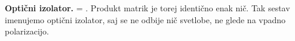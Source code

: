 \begin{example}{\bf Optični izolator.}
\left[\begin{array}{cc}
1 & 0 \\
0 & -1\\
\end{array}\right]
\cdot 
\left[\begin{array}{cc}
1 &  1 \\
i & i\\
\end{array}\right] = 
\left[\!\!\begin{array}{cc}
0 & 0\\
0 & 0\\
\end{array}\right]\!\!.
\label{eq:03_63}
\eeq
Produkt matrik je torej identično enak nič. Tak sestav imenujemo
optični izolator, saj se ne odbije nič svetlobe, ne glede na vpadno 
polarizacijo. 
\end{example}

